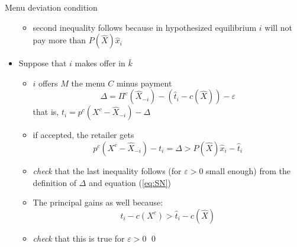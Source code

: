 \documentclass[11pt,english]{beamer}
\newcommand{\ve}{\varepsilon}
\begin{document}
\begin{frame}[allowframebreaks]{Menu deviation condition}
\begin{itemize}
\begin{itemize}
      \item second inequality follows because in hypothesized
        equilibrium $i$ will not pay more than $P(\hat{X})\hat{x}_i$
    \end{itemize}
  \item Suppose that $i$ makes offer in $\bar{k}$
    \begin{itemize}
    \item $i$ offers $M$ the menu $C$ minus payment
     \begin{equation*}
      \Delta = \Pi^c(\hat{X}_{-i})-(\hat{t}_i-c(\hat{X})) - \ve
     \end{equation*}
    that is, $t_i = p^c(X^c-\hat X_{-i}) - \Delta$
    \item if accepted, the retailer gets
      \begin{equation*}
        p^c(X^c - \hat{X}_{-i}) - t_i = \Delta > P(\hat{X})\hat{x}_i -\hat{t}_i
      \end{equation*}
    \item \emph{check} that the last inequality follows (for $\ve>0$ small
      enough) from the definition of $\Delta$ and equation (\ref{eq:SN})
    \item The principal gains as well because:
      \begin{equation*}
        t_i - c(X^c) > \hat{t}_i - c(\hat{X})
      \end{equation*}
    \item \emph{check} that this is true for $\ve >0$ \qed
    \end{itemize}
  \end{itemize}
\end{frame}
\end{document}
